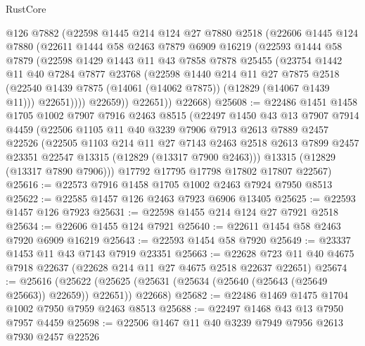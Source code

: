 \begin{lexlean}{RustCore}
\begin{coremodule}
        @126
        @7882
        (@22598
          @1445
          @214
          @124
          @27
          @7880
          @2518
          (@22606
            @1445
            @124
            @7880
            (@22611
              @1444
              @58
              @2463
              @7879
              @6909
              @16219
              (@22593
                @1444
                @58
                @7879
                (@22598
                  @1429
                  @1443
                  @11
                  @43
                  @7858
                  @7878
                  @25455
                  (@23754
                    @1442
                    @11
                    @40
                    @7284
                    @7877
                    @23768
                    (@22598
                      @1440
                      @214
                      @11
                      @27
                      @7875
                      @2518
                      (@22540 @1439 @7875 (@14061 (@14062 @7875)) (@12829 (@14067 @1439 @11)))
                      @22651))))
              @22659))
          @22651))
      @22668)
@25608 := @22486
    @1451
    @1458
    @1705
    @1002
    @7907
    @7916
    @2463
    @8515
    (@22497
      @1450
      @43
      @13
      @7907
      @7914
      @4459
      (@22506
        @1105
        @11
        @40
        @3239
        @7906
        @7913
        @2613
        @7889
        @2457
        @22526
        (@22505
          @1103
          @214
          @11
          @27
          @7143
          @2463
          @2518
          @2613
          @7899
          @2457
          @23351
          @22547
          @13315
          (@12829 (@13317 @7900 @2463)))
        @13315
        (@12829 (@13317 @7890 @7906)))
      @17792
      @17795
      @17798
      @17802
      @17807
      @22567)
@25616 := @22573 @7916 @1458 @1705 @1002 @2463 @7924 @7950 @8513
@25622 := @22585 @1457 @126 @2463 @7923 @6906 @13405
@25625 := @22593 @1457 @126 @7923
@25631 := @22598 @1455 @214 @124 @27 @7921 @2518
@25634 := @22606 @1455 @124 @7921
@25640 := @22611 @1454 @58 @2463 @7920 @6909 @16219
@25643 := @22593 @1454 @58 @7920
@25649 := @23337 @1453 @11 @43 @7143 @7919 @23351
@25663 := @22628 @723 @11 @40 @4675 @7918 @22637 (@22628 @214 @11 @27 @4675 @2518 @22637 @22651)
@25674 := @25616
    (@25622 (@25625 (@25631 (@25634 (@25640 (@25643 (@25649 @25663)) @22659)) @22651)) @22668)
@25682 := @22486 @1469 @1475 @1704 @1002 @7950 @7959 @2463 @8513
@25688 := @22497 @1468 @43 @13 @7950 @7957 @4459
@25698 := @22506 @1467 @11 @40 @3239 @7949 @7956 @2613 @7930 @2457 @22526

\end{coremodule}
\end{lexlean}

